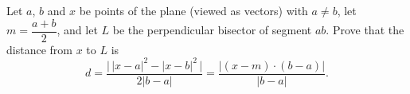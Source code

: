 Let $a$, $b$ and $x$ be points of the plane (viewed as vectors) with $a\ne b$, let $m=\dfrac{a+b}{2}$, and let $L$ be the perpendicular bisector of segment $ab$. Prove that the distance from $x$ to $L$ is
\[
d=\dfrac{\bigl|\,|x-a|^2-|x-b|^2\,\bigr|}{2|b-a|}=\dfrac{|(x-m)\cdot(b-a)|}{|b-a|}.
\]
